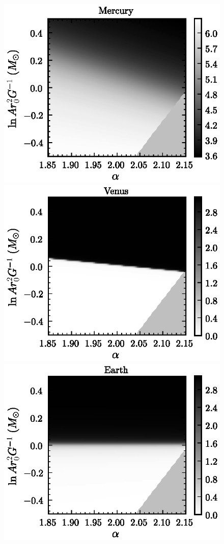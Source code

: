 \clearpage
\begin{figure}
\includegraphics[height=.2\textheight]{figs_solarsystem/phase_Mercury.ps}
\includegraphics[height=.2\textheight]{figs_solarsystem/phase_Venus.ps}\\
\includegraphics[height=.2\textheight]{figs_solarsystem/phase_Earth.ps}

\end{figure}
